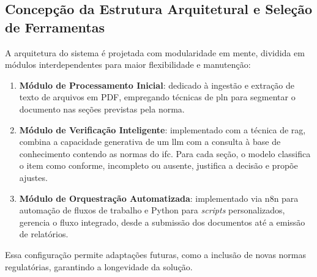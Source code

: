 \subsection{Concepção da Estrutura Arquitetural e Seleção de Ferramentas}
A arquitetura do sistema é projetada com modularidade em mente, dividida em módulos interdependentes para maior flexibilidade e manutenção:
\begin{enumerate}
    \item \textbf{Módulo de Processamento Inicial}: dedicado à ingestão e extração de texto de arquivos em PDF, empregando técnicas de \gls{pln} para segmentar o documento nas seções previstas pela norma.
    \item \textbf{Módulo de Verificação Inteligente}: implementado com a técnica de \gls{rag}, combina a capacidade generativa de um \gls{llm} com a consulta à base de conhecimento contendo as normas do \gls{ifc}. Para cada seção, o modelo classifica o item como conforme, incompleto ou ausente, justifica a decisão e propõe ajustes.
    \item \textbf{Módulo de Orquestração Automatizada}: implementado via n8n para automação de fluxos de trabalho e Python para \textit{scripts} personalizados, gerencia o fluxo integrado, desde a submissão dos documentos até a emissão de relatórios.
\end{enumerate}
Essa configuração permite adaptações futuras, como a inclusão de novas normas regulatórias, garantindo a longevidade da solução.

